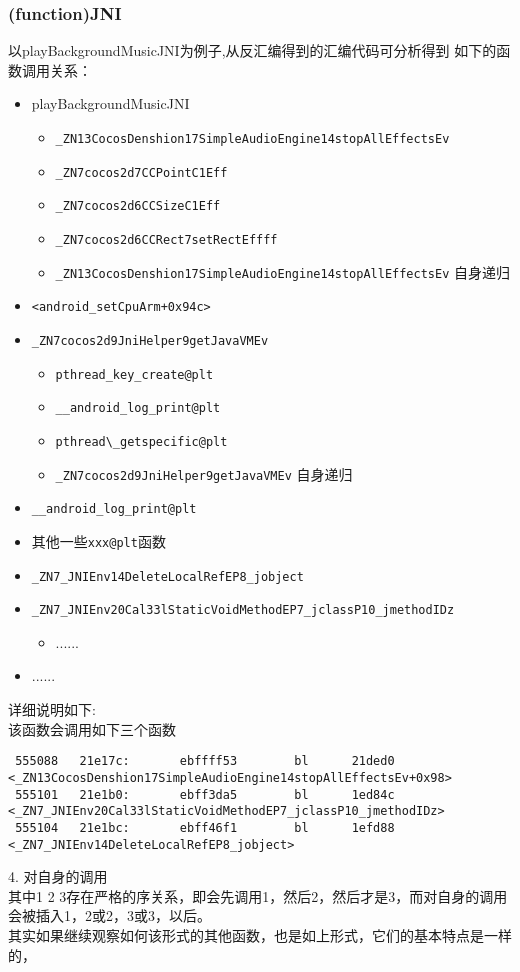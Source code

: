 \subsubsection{(function)JNI}
以playBackgroundMusicJNI为例子,从反汇编得到的汇编代码可分析得到
如下的函数调用关系：
\begin{itemize}
\item playBackgroundMusicJNI
  \begin{itemize}
  \item \verb|_ZN13CocosDenshion17SimpleAudioEngine14stopAllEffectsEv|
  \item \verb|_ZN7cocos2d7CCPointC1Eff|
  \item \verb|_ZN7cocos2d6CCSizeC1Eff|
  \item \verb|_ZN7cocos2d6CCRect7setRectEffff|
  \item \verb|_ZN13CocosDenshion17SimpleAudioEngine14stopAllEffectsEv| 
	自身递归
  \end{itemize}
\item \verb|<android_setCpuArm+0x94c>|
\item \verb|_ZN7cocos2d9JniHelper9getJavaVMEv|
  \begin{itemize}
  \item \verb|pthread_key_create@plt|
  \item \verb|__android_log_print@plt|
  \item \verb|pthread\_getspecific@plt|
  \item \verb|_ZN7cocos2d9JniHelper9getJavaVMEv| 自身递归
  \end{itemize}
\item \verb|__android_log_print@plt|
\item 其他一些\verb|xxx@plt|函数
\item \verb|_ZN7_JNIEnv14DeleteLocalRefEP8_jobject|
\item \verb|_ZN7_JNIEnv20Cal33lStaticVoidMethodEP7_jclassP10_jmethodIDz|
  \begin{itemize}
  \item ......
  \end{itemize}
\item ......
\end{itemize}
详细说明如下:\\
该函数会调用如下三个函数\\
\begin{lstlisting}
 555088   21e17c:       ebffff53        bl      21ded0 <_ZN13CocosDenshion17SimpleAudioEngine14stopAllEffectsEv+0x98>
 555101   21e1b0:       ebff3da5        bl      1ed84c <_ZN7_JNIEnv20Cal33lStaticVoidMethodEP7_jclassP10_jmethodIDz>
 555104   21e1bc:       ebff46f1        bl      1efd88 <_ZN7_JNIEnv14DeleteLocalRefEP8_jobject>
\end{lstlisting}
 4.  对自身的调用\\
其中1 2 3存在严格的序关系，即会先调用1，然后2，然后才是3，而对自身的调用会被插入1，2或2，3或3，以后。\\
其实如果继续观察如何该形式的其他函数，也是如上形式，它们的基本特点是一样的，\\



